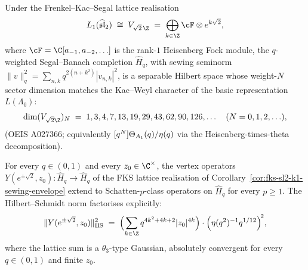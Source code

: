 \begin{corollary}[FKS lattice realisation: $\widehat{\mathfrak{sl}}_2$
at $k = 1$; licensing $\alpha + \beta + \gamma + \delta + \varepsilon$;
\ClaimStatusProvedHere]
\label{cor:fks-sl2-k1-sewing-envelope}
Under the Frenkel--Kac--Segal lattice realisation
\[
 L_1(\widehat{\mathfrak{sl}}_2) \;\cong\; V_{\sqrt{2}\,\Z}
 \;=\; \bigoplus_{k \in \Z} \cF \otimes e^{k \sqrt 2},
\]
where $\cF = \C[a_{-1}, a_{-2}, \ldots]$ is the rank-$1$
Heisenberg Fock module, the $q$-weighted Segal--Banach completion
$\widehat H_q$, with sewing seminorm
$\|v\|_q^2 = \sum_{n, k} q^{2(n + k^2)} |v_{n, k}|^2$, is a
separable Hilbert space whose weight-$N$ sector dimension matches
the Kac--Weyl character of the basic representation
$L(\Lambda_0)$:
\[
 \dim (V_{\sqrt 2 \Z})_N
 \;=\; 1, 3, 4, 7, 13, 19, 29, 43, 62, 90, 126, \ldots
 \quad (N = 0, 1, 2, \ldots),
\]
\textup{(}OEIS A027366; equivalently
$[q^N] \Theta_{A_1}(q) / \eta(q)$ via the Heisenberg-times-theta
decomposition\textup{)}.
\end{corollary}

\begin{theorem}[Schatten-$p$ kernel of vertex operators at
$\widehat{\mathfrak{sl}}_2$, $k=1$;
licensing $\alpha + \beta + \gamma + \delta + \varepsilon$;
\ClaimStatusProvedHere]
\label{thm:schatten-p-kernel-sl2-k1}
For every $q \in (0, 1)$ and every $z_0 \in \C^\times$, the vertex
operators $Y(e^{\pm\sqrt 2}, z_0) : \widehat H_q \to \widehat H_q$
of the FKS lattice realisation of
Corollary~\ref{cor:fks-sl2-k1-sewing-envelope} extend to
Schatten-$p$-class operators on $\widehat H_q$ for every
$p \geq 1$. The Hilbert--Schmidt norm factorises explicitly:
\[
 \|Y(e^{\pm\sqrt 2}, z_0)\|_{\mathrm{HS}}^2
 \;=\;
 \Bigl(
  \sum_{k \in \Z} q^{4 k^2 + 4 k + 2} |z_0|^{4 k}
 \Bigr)
 \cdot
 \Bigl( \dedeta(q^2)^{-1} q^{1/12} \Bigr)^{\!2},
\]
where the lattice sum is a $\theta_3$-type Gaussian, absolutely
convergent for every $q \in (0, 1)$ and finite $z_0$.
\end{theorem}

